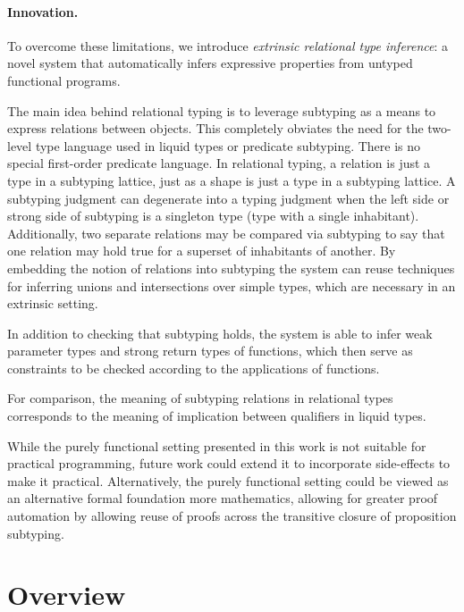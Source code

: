 \documentclass[acmsmall]{acmart}
\theoremstyle{definition}
\begin{document}
\paragraph{Innovation.} 
To overcome these limitations, we introduce \textit{extrinsic relational type inference}: 
a novel system
that automatically infers expressive properties from untyped functional programs. 

The main idea behind relational typing is to leverage subtyping as a means to express relations
between objects. This completely obviates the need for the two-level type language
used in liquid types or predicate subtyping. There is no special first-order predicate language. 
In relational typing, a relation is just a type in a subtyping lattice, just as a shape is just  
a type in a subtyping lattice. A subtyping judgment can degenerate into a typing judgment
when the left side or strong side of subtyping is a singleton type (type with a single inhabitant).
Additionally, two separate relations may be compared via subtyping to say that one relation may hold true for a superset of inhabitants 
of another.
By embedding the notion of relations into subtyping the system can reuse techniques for inferring unions and
intersections over simple types, which are necessary in an extrinsic setting. 

In addition to checking that subtyping holds, the system is able to infer weak 
parameter types and strong return types of functions, which then serve as constraints
to be checked according to the applications of functions.

For comparison, the meaning of subtyping relations in relational types corresponds 
to the meaning of implication between qualifiers in liquid types.

While the purely functional setting presented in this work is not suitable for practical programming,
future work could extend it to incorporate side-effects to make it practical.
Alternatively, the purely functional setting could be viewed as an alternative formal foundation more
mathematics, allowing for greater proof automation by allowing reuse of proofs across the transitive closure of 
proposition subtyping.



\section{Overview}
\end{document}
